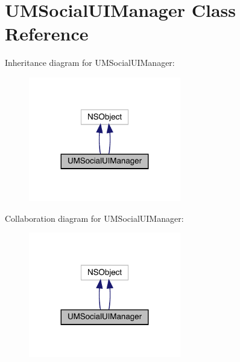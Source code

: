 \hypertarget{interface_u_m_social_u_i_manager}{}\section{U\+M\+Social\+U\+I\+Manager Class Reference}
\label{interface_u_m_social_u_i_manager}


Inheritance diagram for U\+M\+Social\+U\+I\+Manager\+:\nopagebreak
\begin{figure}[H]
\begin{center}
\leavevmode
\includegraphics[width=188pt]{interface_u_m_social_u_i_manager__inherit__graph}
\end{center}
\end{figure}


Collaboration diagram for U\+M\+Social\+U\+I\+Manager\+:\nopagebreak
\begin{figure}[H]
\begin{center}
\leavevmode
\includegraphics[width=188pt]{interface_u_m_social_u_i_manager__coll__graph}
\end{center}
\end{figure}
